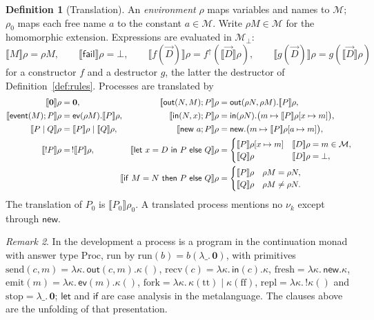 \documentclass[11pt]{article}
\theoremstyle{definition}
\newtheorem{definition}{Definition}[section]
\theoremstyle{plain}
\theoremstyle{remark}
\newtheorem{remark}[definition]{Remark}
\newcommand{\Proc}{\mathrm{Proc}}
\newcommand{\sem}[1]{\llbracket #1 \rrbracket}
\begin{document}
\begin{definition}[Translation]
An \textit{environment} $\rho$ maps variables and names to $\mathcal{M}$; $\rho_0$ maps each free name $a$ to the constant $a\in\mathcal{M}$. Write $\rho M\in\mathcal{M}$ for the homomorphic extension. Expressions are evaluated in $\mathcal{M}_{\bot}$:
\[
\sem{M}\rho=\rho M,\qquad \sem{\mathsf{fail}}\rho=\bot,\qquad
\sem{f(\vec D)}\rho=f^{\uparrow}(\sem{\vec D}\rho),\qquad
\sem{g(\vec D)}\rho=g(\sem{\vec D}\rho)
\]
for a constructor $f$ and a destructor $g$, the latter the destructor of Definition~\ref{def:rules}. Processes are translated by
\begin{align*}
\sem{\mathbf{0}}\rho&=\mathbf{0},&
\sem{\mathsf{out}(N,M);P}\rho&=\mathsf{out}(\rho N,\rho M).\sem{P}\rho,\\
\sem{\mathsf{event}(M);P}\rho&=\mathsf{ev}(\rho M).\sem{P}\rho,&
\sem{\mathsf{in}(N,x);P}\rho&=\mathsf{in}(\rho N).\big(m\mapsto\sem{P}\rho[x\mapsto m]\big),\\
\sem{P\mid Q}\rho&=\sem{P}\rho\mid\sem{Q}\rho,&
\sem{\mathsf{new}\ a;P}\rho&=\mathsf{new}.\big(m\mapsto\sem{P}\rho[a\mapsto m]\big),\\
\sem{!P}\rho&=\,!\sem{P}\rho,&
\sem{\mathsf{let}\ x=D\ \mathsf{in}\ P\ \mathsf{else}\ Q}\rho&=
\begin{cases}\sem{P}\rho[x\mapsto m]&\sem{D}\rho=m\in\mathcal{M},\\ \sem{Q}\rho&\sem{D}\rho=\bot,\end{cases}\\
&&\mathllap{\sem{\mathsf{if}\ M=N\ \mathsf{then}\ P\ \mathsf{else}\ Q}\rho}&=
\begin{cases}\sem{P}\rho&\rho M=\rho N,\\ \sem{Q}\rho&\rho M\ne\rho N.\end{cases}
\end{align*}
The translation of $P_0$ is $\sem{P_0}\rho_0$. A translated process mentions no $\nu_k$ except through $\mathsf{new}$.
\end{definition}

\begin{remark}
In the development a process is a program in the continuation monad with answer type $\Proc$, run by $\mathrm{run}(b)=b(\lambda\_.\,\mathbf{0})$, with primitives $\mathrm{send}(c,m)=\lambda\kappa.\,\mathsf{out}(c,m).\kappa()$, $\mathrm{recv}(c)=\lambda\kappa.\,\mathsf{in}(c).\kappa$, $\mathrm{fresh}=\lambda\kappa.\,\mathsf{new}.\kappa$, $\mathrm{emit}(m)=\lambda\kappa.\,\mathsf{ev}(m).\kappa()$, $\mathrm{fork}=\lambda\kappa.\,\kappa(\mathrm{tt})\mid\kappa(\mathrm{ff})$, $\mathrm{repl}=\lambda\kappa.\,!\kappa()$ and $\mathrm{stop}=\lambda\_.\,\mathbf{0}$; $\mathsf{let}$ and $\mathsf{if}$ are case analysis in the metalanguage. The clauses above are the unfolding of that presentation.
\end{remark}
\end{document}
